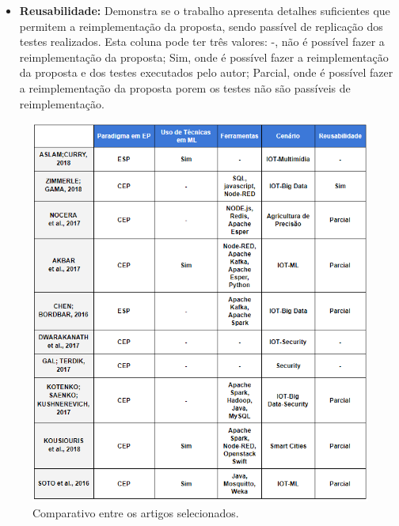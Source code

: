 \documentclass[ti,table]{texufpel} %
\begin{document}
\begin{itemize}
     

     \item \textbf{Reusabilidade:} Demonstra se o trabalho apresenta detalhes suficientes que permitem a reimplementação da proposta, sendo passível de replicação dos testes realizados. Esta coluna pode ter três valores: -, não é possível fazer a reimplementação da proposta; Sim, onde é possível fazer a reimplementação da proposta e dos testes executados pelo autor; Parcial, onde é possível fazer a reimplementação da proposta porem os testes não são passíveis de reimplementação. 

   

\end{itemize} 

  

\begin{figure} 

    \centering 

    \includegraphics[width=1\textwidth]{imagens/comparacaoArtigos.png} 

    \caption{Comparativo entre os artigos selecionados.} 

    \label{fig:comparacaoArtigos} 

\end{figure} 
\end{document}
